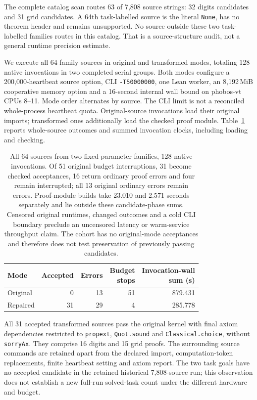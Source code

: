 \documentclass[10pt,twocolumn]{article}
\begin{document}
The complete catalog scan routes 63 of 7,808 source strings: 32 digits
candidates and 31 grid candidates. A 64th task-labelled source is the
literal \texttt{None}, has no theorem header and remains unsupported.
No source outside these two task-labelled families routes in this catalog.
That is a source-structure audit, not a general runtime precision estimate.

We execute all 64 family sources in original and transformed modes, totaling
128 native invocations in two completed serial groups. Both modes configure
a 200,000-heartbeat source option, CLI \texttt{-T50000000}, one Lean worker,
an 8,192\,MiB cooperative memory option and a 16-second internal wall bound
on phobos-vt CPUs 8--11. Mode order alternates by source. The CLI limit is
not a reconciled whole-process heartbeat quota. Original-source invocations
load their original imports; transformed ones additionally load the checked
proof module. Table~\ref{tab:certificate-native64} reports whole-source
outcomes and summed invocation clocks, including loading and checking.

\begin{table}[t]
\centering
\small
\setlength{\tabcolsep}{4pt}
\begin{tabular}{lrrrr}
\toprule
Mode & Accepted & Errors & \shortstack{Budget\\stops} &
\shortstack{Invocation-wall\\sum (s)} \\
\midrule
Original & 0 & 13 & 51 & 879.431 \\
Repaired & 31 & 29 & 4 & 285.778 \\
\bottomrule
\end{tabular}
\caption{All 64 sources from two fixed-parameter families, 128 native
invocations. Of 51 original budget interruptions, 31 become checked
acceptances, 16 return ordinary proof errors and four remain interrupted;
all 13 original ordinary errors remain errors. Proof-module builds take
23.010 and 2.571 seconds separately and lie outside these candidate-phase
sums. Censored original runtimes, changed outcomes and a cold CLI boundary
preclude an uncensored latency or warm-service throughput claim.
The cohort has no original-mode acceptances and therefore does not test
preservation of previously passing candidates.}
\label{tab:certificate-native64}
\end{table}

All 31 accepted transformed sources pass the original kernel with final
axiom dependencies restricted to \texttt{propext}, \texttt{Quot.sound} and
\texttt{Classical.choice}, without \texttt{sorryAx}. They comprise 16 digits
and 15 grid proofs. The surrounding source commands are retained apart
from the declared import, computation-token replacements, finite heartbeat
setting and axiom report. The two task goals have no accepted candidate in
the retained historical 7,808-source run; this observation does not establish
a new full-run solved-task count under the different hardware and budget.
\end{document}
